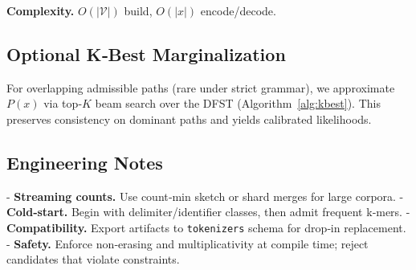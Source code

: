 \textbf{Complexity.} $O(|\mathcal{V}|)$ build, $O(|x|)$ encode/decode.

\subsection{Optional K‑Best Marginalization}

For overlapping admissible paths (rare under strict grammar), we approximate $P(x)$ via top‑$K$ beam search over the DFST (Algorithm~\ref{alg:kbest}). This preserves consistency on dominant paths and yields calibrated likelihoods.

\subsection{Engineering Notes}

- \textbf{Streaming counts.} Use count‑min sketch or shard merges for large corpora.
- \textbf{Cold‑start.} Begin with delimiter/identifier classes, then admit frequent k‑mers.
- \textbf{Compatibility.} Export artifacts to \texttt{tokenizers} schema for drop‑in replacement.
- \textbf{Safety.} Enforce non‑erasing and multiplicativity at compile time; reject candidates that violate constraints.
